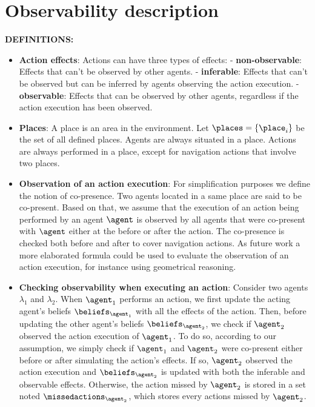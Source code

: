 \section{Observability description}

\textbf{DEFINITIONS:}
\begin{itemize}

    \item \textbf{Action effects}: 
    Actions can have three types of effects: 
    \subitem - \textbf{non-observable}: Effects that can't be observed by other agents.
    \subitem - \textbf{inferable}: Effects that can't be observed but can be inferred by agents observing the action execution.
    \subitem - \textbf{observable}: Effects that can be observed by other agents, regardless if the action execution has been observed.
    
    \item \textbf{Places}: 
    A place is an area in the environment. Let $\places=\{ \place_i \}$ be the set of all defined places. Agents are always situated in a place. Actions are always performed in a place, except for navigation actions that involve two places.
    
    \item \textbf{Observation of an action execution}: 
    For simplification purposes we define the notion of co-presence. Two agents located in a same place are said to be co-present.
    Based on that, we assume that the execution of an action being performed by an agent $\agent$ is observed by all agents that were co-present with $\agent$ either at the before or after the action.
    The co-presence is checked both before and after to cover navigation actions.
    As future work a more elaborated formula could be used to evaluate the observation of an action execution, for instance using geometrical reasoning.
    
    \item \textbf{Checking observability when executing an action}: 
    Consider two agents $\lambda_1$ and $\lambda_2$. When $\agent_1$ performs an action, we first update the acting agent's beliefs $\beliefs_{\agent_1}$ with all the effects of the action. Then, before updating the other agent's beliefs $\beliefs_{\agent_2}$, we check if $\agent_2$ observed the action execution of $\agent_1$. 
    To do so, according to our assumption, we simply check if $\agent_1$ and $\agent_2$ were co-present either before or after simulating the action's effects. If so, $\agent_2$ observed the action execution and $\beliefs_{\agent_2}$ is updated with both the inferable and observable effects. 
    Otherwise, the action missed by $\agent_2$ is stored in a set noted $\missedactions_{\agent_2}$, which stores every actions missed by $\agent_2$.
    

\end{itemize}
